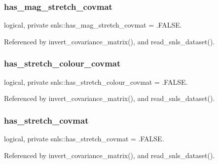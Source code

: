 \subsubsection{\texorpdfstring{has\+\_\+mag\+\_\+stretch\+\_\+covmat}{has\_mag\_stretch\_covmat}}
{\footnotesize\ttfamily logical, private snls\+::has\+\_\+mag\+\_\+stretch\+\_\+covmat = .F\+A\+L\+S\+E.\hspace{0.3cm}{\ttfamily [private]}}



Referenced by invert\+\_\+covariance\+\_\+matrix(), and read\+\_\+snls\+\_\+dataset().

\mbox{\label{namespacesnls_a72767d5a50117b705a1dcb971e24462d}} 
\subsubsection{\texorpdfstring{has\+\_\+stretch\+\_\+colour\+\_\+covmat}{has\_stretch\_colour\_covmat}}
{\footnotesize\ttfamily logical, private snls\+::has\+\_\+stretch\+\_\+colour\+\_\+covmat = .F\+A\+L\+S\+E.\hspace{0.3cm}{\ttfamily [private]}}



Referenced by invert\+\_\+covariance\+\_\+matrix(), and read\+\_\+snls\+\_\+dataset().

\mbox{\label{namespacesnls_ae63c79b57efec7300a23d6437079ddae}} 
\subsubsection{\texorpdfstring{has\+\_\+stretch\+\_\+covmat}{has\_stretch\_covmat}}
{\footnotesize\ttfamily logical, private snls\+::has\+\_\+stretch\+\_\+covmat = .F\+A\+L\+S\+E.\hspace{0.3cm}{\ttfamily [private]}}



Referenced by invert\+\_\+covariance\+\_\+matrix(), and read\+\_\+snls\+\_\+dataset().

\mbox{\label{namespacesnls_a62af67a93e31f94478aa58343fe5c04d}} 
